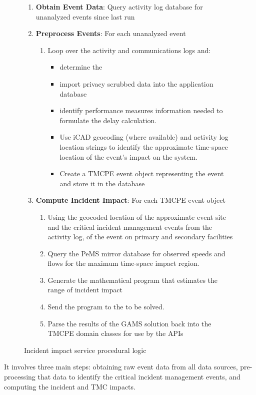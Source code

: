 \documentclass[12pt]{report}
\newcounter{time}
\newcounter{space}
\begin{document}
\begin{figure}[t]
  \centering
  \begin{enumerate}
  \item {\sc \textbf{Obtain Event Data}}: Query activity log database
    for unanalyzed events since last run
  \item {\sc\textbf{Preprocess Events}}: For each unanalyzed event
    \begin{enumerate}
    \item Loop over the activity and communications logs and:
      \begin{itemize}
      \item determine the 
      \item import privacy scrubbed data into the application database
      \item identify performance measures information needed to
        formulate the delay calculation.
      \item Use \ac{iCAD} geocoding (where available) and activity log
        location strings to identify the approximate time-space
        location of the event's impact on the
        system.
      \item Create a \ac{TMCPE} event object representing the event and
        store it in the database
      \end{itemize}
    \end{enumerate}
  \item {\sc\textbf{Compute Incident Impact}}: For each \ac{TMCPE} event object
    \begin{enumerate}
    \item Using the geocoded location of the approximate event site and
      the critical incident management events from the activity log,
       of the event on primary and secondary facilities
    \item Query the \ac{PeMS} mirror database for observed speeds and flows
      for the maximum time-space impact region.
    \item Generate the mathematical program that estimates the range
      of incident impact
    \item Send the program to the  to be solved.
    \item Parse the results of the GAMS solution back into the \ac{TMCPE}
      domain classes for use by the \acp{API}
    \end{enumerate}
  \end{enumerate}
  \caption{Incident impact service procedural logic}
  \label{fig:inc-imp-serv}
\end{figure}
It involves three main steps: obtaining raw event data from all data
sources, pre-processing that data to identify the critical incident
management events, and computing the incident and TMC impacts.
\end{document}
